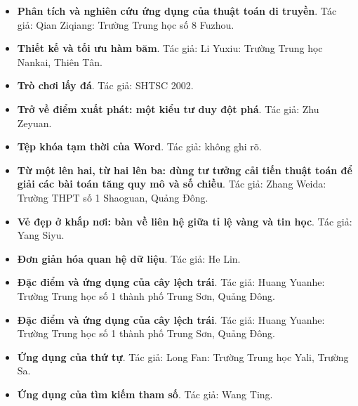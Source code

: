 \documentclass[11pt]{article}
\begin{document}
\begin{itemize}[leftmargin=2em]
  \item \textbf{Phân tích và nghiên cứu ứng dụng của thuật toán di truyền}. Tác giả: Qian Ziqiang: Trường Trung học số 8 Fuzhou.
  \item \textbf{Thiết kế và tối ưu hàm băm}. Tác giả: Li Yuxiu: Trường Trung học Nankai, Thiên Tân.
  \item \textbf{Trò chơi lấy đá}. Tác giả: SHTSC 2002.
  \item \textbf{Trở về điểm xuất phát: một kiểu tư duy đột phá}. Tác giả: Zhu Zeyuan.
  \item \textbf{Tệp khóa tạm thời của Word}. Tác giả: không ghi rõ.
  \item \textbf{Từ một lên hai, từ hai lên ba: dùng tư tưởng cải tiến thuật toán để giải các bài toán tăng quy mô và số chiều}. Tác giả: Zhang Weida: Trường THPT số 1 Shaoguan, Quảng Đông.
  \item \textbf{Vẻ đẹp ở khắp nơi: bàn về liên hệ giữa tỉ lệ vàng và tin học}. Tác giả: Yang Siyu.
  \item \textbf{Đơn giản hóa quan hệ dữ liệu}. Tác giả: He Lin.
  \item \textbf{Đặc điểm và ứng dụng của cây lệch trái}. Tác giả: Huang Yuanhe: Trường Trung học số 1 thành phố Trung Sơn, Quảng Đông.
  \item \textbf{Đặc điểm và ứng dụng của cây lệch trái}. Tác giả: Huang Yuanhe: Trường Trung học số 1 thành phố Trung Sơn, Quảng Đông.
  \item \textbf{Ứng dụng của thứ tự}. Tác giả: Long Fan: Trường Trung học Yali, Trường Sa.
  \item \textbf{Ứng dụng của tìm kiếm tham số}. Tác giả: Wang Ting.
\end{itemize}
\end{document}
